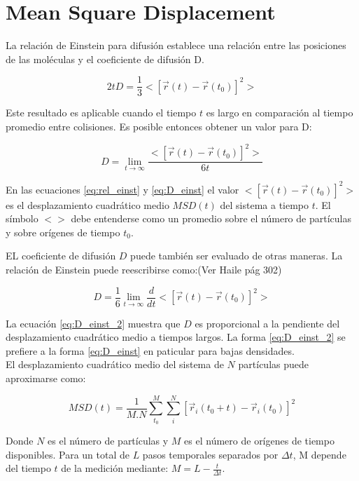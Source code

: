 \documentclass[
 reprint,
 amsmath,amssymb,
 aps,
 a4paper
]{revtex4-1}
\begin{document}
\section{\label{seq:msd}Mean Square Displacement}

La relación de Einstein para difusión establece una relación entre las posiciones de las moléculas y el coeficiente de difusión D.

\begin{equation}\label{eq:rel_einst}
2tD=\frac{1}{3}<[\vec{r}(t)-\vec{r}(t_0)]^2>
\end{equation}

Este resultado es aplicable cuando el tiempo $t$ es largo en comparación al tiempo promedio entre colisiones. Es posible entonces obtener un valor para D:

\begin{equation}\label{eq:D_einst}
D=\lim_{t \to \infty}\frac{<[\vec{r}(t)-\vec{r}(t_0)]^2>}{6t}
\end{equation} 

En las ecuaciones \ref{eq:rel_einst} y \ref{eq:D_einst} el valor $<[\vec{r}(t)-\vec{r}(t_0)]^2>$ es el desplazamiento cuadrático medio $MSD(t)$ del sistema  a tiempo $t$. El símbolo $<>$ debe entenderse como un promedio sobre el número de partículas y sobre orígenes de tiempo $t_0$.

EL coeficiente de difusión $D$ puede también ser evaluado de otras maneras. La relación de Einstein puede reescribirse como:(Ver Haile pág 302)

\begin{equation}\label{eq:D_einst_2}
D=\frac{1}{6}\lim_{t \to \infty}\frac{d}{dt}<[\vec{r}(t)-\vec{r}(t_0)]^2>
\end{equation}

La ecuación \ref{eq:D_einst_2} muestra que $D$ es proporcional a la pendiente del desplazamiento cuadrático medio a tiempos largos. La forma \ref{eq:D_einst_2} se prefiere a la forma \ref{eq:D_einst} en paticular para bajas densidades.\\

El desplazamiento cuadrático medio del sistema de $N$ partículas puede aproximarse como:

\begin{equation}\label{eq:MSD}
MSD(t)=\frac{1}{M.N}\sum_{t_0}^{M}\sum_{i}^{N}[\vec{r}_i(t_0+t)-\vec{r}_i(t_0)]^2
\end{equation}

Donde $N$ es el número de partículas y $M$ es el número de orígenes de tiempo disponibles. Para un total de $L$ pasos temporales separados por $\Delta t$, M depende del tiempo $t$ de la medición mediante: $M=L-\frac{t}{\Delta t}$. 
\end{document}
